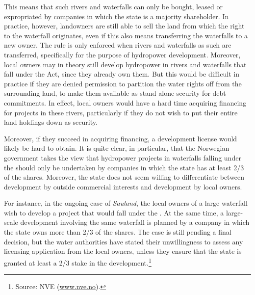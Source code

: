 This means that such rivers and waterfalls can only be bought, leased or expropriated by companies in which the state is a majority shareholder. In practice, however, landowners are still able to sell the land from which the right to the waterfall originates, even if this also means transferring the waterfalls to a new owner. The rule is only enforced when rivers and waterfalls as such are transferred, specifically for the purpose of hydropower development. Moreover, local owners may in theory still develop hydropower in rivers and waterfalls that fall under the Act, since they already own them. But this would be difficult in practice if they are denied permission to partition the water rights off from the surrounding land, to make them available as stand-alone security for debt commitments. In effect, local owners would have a hard time acquiring financing for projects in these rivers, particularly if they do not wish to put their entire land holdings down as security.

Moreover, if they succeed in acquiring financing, a development license would likely be hard to obtain. It is quite clear, in particular, that the Norwegian government takes the view that hydropower projects in waterfalls falling under the \cite{ica17} should only be undertaken by companies in which the state has at least 2/3 of the shares. Moreover, the state does not seem willing to differentiate between development by outside commercial interests and development by local owners.

For instance, in the ongoing case of {\it Sauland}, the local owners of a large waterfall wish to develop a project that would fall under the \cite{ica17}. At the same time, a large-scale development involving the same waterfall is planned by a company in which the state owns more than 2/3 of the shares. The case is still pending a final decision, but the water authorities have stated their unwillingness to assess any licensing application from the local owners, unless they ensure that the state is granted at least a 2/3 stake in the development.\footnote{Source: NVE (\url{www.nve.no}).}

